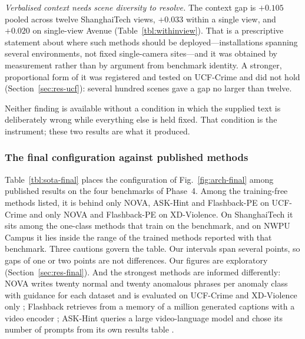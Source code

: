 \documentclass[a4paper,fleqn]{cas-sc}
\begin{document}
\emph{Verbalised context needs scene diversity to resolve.} The context gap is
$+0.105$ pooled across twelve ShanghaiTech views, $+0.033$ within a single view,
and $+0.020$ on single-view Avenue (Table~\ref{tbl:withinview}). That is a
prescriptive statement about where such methods should be deployed---installations
spanning several environments, not fixed single-camera sites---and it was obtained
by measurement rather than by argument from benchmark identity. A stronger,
proportional form of it was registered and tested on UCF-Crime and did not hold
(Section~\ref{sec:res-ucf}): several hundred scenes gave a gap no larger than
twelve.

Neither finding is available without a condition in which the supplied text is
deliberately wrong while everything else is held fixed. That condition is the
instrument; these two results are what it produced.

\subsubsection{The final configuration against published methods}
\label{sec:res-final-comparison}
Table~\ref{tbl:sota-final} places the configuration of
Fig.~\ref{fig:arch-final} among published results on the four benchmarks of
Phase~4. Among the training-free methods listed, it is behind only NOVA, ASK-Hint
and Flashback-PE on UCF-Crime and only NOVA and Flashback-PE on XD-Violence. On
ShanghaiTech it sits among the one-class methods
that train on the benchmark, and on NWPU Campus it lies inside the range of the
trained methods reported with that benchmark. Three cautions govern the table.
Our intervals span several points, so gaps of one or two points are not
differences. Our figures are exploratory (Section~\ref{sec:res-final}). And the
strongest methods are informed differently: NOVA writes twenty normal and twenty
anomalous phrases per anomaly class with guidance for each dataset and is
evaluated on UCF-Crime and XD-Violence only \citep{yin2026nova}; Flashback
retrieves from a memory of a million generated captions with a video encoder
\citep{lee2025flashback}; ASK-Hint queries a large video-language model and chose
its number of prompts from its own results table \citep{zou2026askhint}.
\end{document}
